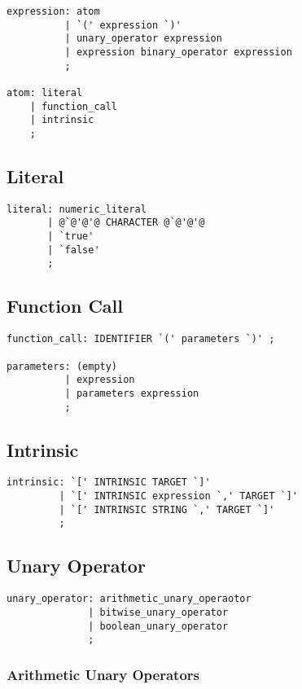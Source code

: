 \documentclass{article}
\begin{document}
\begin{lstlisting}
expression: atom
          | `(' expression `)'
          | unary_operator expression
          | expression binary_operator expression
          ;

atom: literal
    | function_call
    | intrinsic
    ;
\end{lstlisting}

\subsection{Literal}

\begin{lstlisting}[escapechar=@,upquote=true]
literal: numeric_literal
       | @`@'@'@ CHARACTER @`@'@'@
       | `true'
       | `false'
       ;
\end{lstlisting}

\subsection{Function Call}

\begin{lstlisting}
function_call: IDENTIFIER `(' parameters `)' ;

parameters: (empty)
          | expression
          | parameters expression
          ;
\end{lstlisting}

\subsection{Intrinsic}

\begin{lstlisting}
intrinsic: `[' INTRINSIC TARGET `]'
         | `[' INTRINSIC expression `,' TARGET `]'
         | `[' INTRINSIC STRING `,' TARGET `]'
         ;
\end{lstlisting}

\subsection{Unary Operator}

\begin{lstlisting}
unary_operator: arithmetic_unary_operaotor
              | bitwise_unary_operator
              | boolean_unary_operator
              ;
\end{lstlisting}

\subsubsection{Arithmetic Unary Operators}
\end{document}
